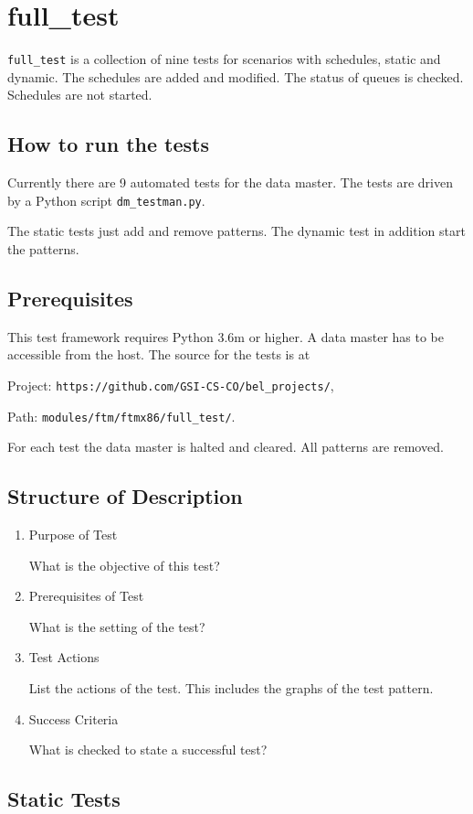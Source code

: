 \section{full\_test}
\texttt{full\_test} is a collection of nine tests for scenarios with schedules, static and dynamic. The schedules are added and modified. The
status of queues is checked. Schedules are not started.
\subsection{How to run the tests}
Currently there are 9 automated tests for the data master. The tests are driven by a Python script \texttt{dm\_testman.py}.

The static tests just add and remove patterns. The dynamic test in addition start the patterns.
\subsection{Prerequisites}
This test framework requires Python 3.6m or higher. A data master has to be accessible from the host.
The source for the tests is at

Project: \texttt{https://github.com/GSI-CS-CO/bel\_projects/},

Path: \texttt{modules/ftm/ftmx86/full\_test/}.

For each test the data master is halted and cleared. All patterns are removed.

\subsection{Structure of Description}
\begin{enumerate}
	\item Purpose of Test

	What is the objective of this test?
	\item Prerequisites of Test

	What is the setting of the test?
	\item Test Actions

	List the actions of the test. This includes the graphs of the test pattern.
	\item Success Criteria

	What is checked to state a successful test?
\end{enumerate}
\subsection{Static Tests}
